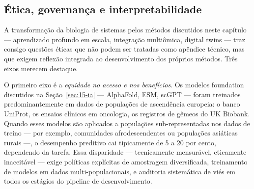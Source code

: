 


\subsection{Ética, governança e interpretabilidade}
\label{sec:15-etica}

A transformação da biologia de sistemas pelos métodos discutidos neste capítulo --- aprendizado profundo em escala, integração multiômica, digital twins --- traz consigo questões éticas que não podem ser tratadas como apêndice técnico, mas que exigem reflexão integrada ao desenvolvimento dos próprios métodos. Três eixos merecem destaque.

O primeiro eixo é a \emph{equidade no acesso e nos benefícios}. Os modelos foundation discutidos na Seção~\ref{sec:15-ia} --- AlphaFold, ESM, scGPT --- foram treinados predominantemente em dados de populações de ascendência europeia: o banco UniProt, os ensaios clínicos em oncologia, os registros de gêmeos do UK Biobank. Quando esses modelos são aplicados a populações sub-representadas nos dados de treino --- por exemplo, comunidades afrodescendentes ou populações asiáticas rurais ---, o desempenho preditivo cai tipicamente de 5 a 20 por cento, dependendo da tarefa. Essa disparidade --- tecnicamente mensurável, eticamente inaceitável --- exige políticas explícitas de amostragem diversificada, treinamento de modelos em dados multi-populacionais, e auditoria sistemática de viés em todos os estágios do pipeline de desenvolvimento.

